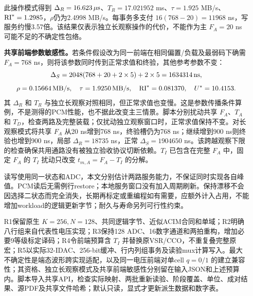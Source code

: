 此操作模式得到 $\Delta_R=16.623\,\mu\mathrm{s}$、$T_R=17.021952$ ms、$\tau=1.925$ MB/s、$\mathrm{RI}^*=1.2985$，$\rho$仍为2.4998 MB/s。每事务多支付 $16(768-20)=11968$ ns，写服务约慢3.57倍。该结果仅表示独立长观察操作的代价，不能作为主 $F_A=20$ ns 可能不足的不确定性包络。

\textbf{共享前端参数敏感性。}若条件假设改为同一前端在相同偏置/负载及最弱码下确需 $F_A=768$ ns，则将该参数同时传到正常求值和终验，其他参考参数不变：
\[
 \Delta_S=2048(768+20+2\times5)+2\times5=1634314\,\mathrm{ns},
\]
\[
 \rho=0.15664\,\mathrm{MB/s},\quad
 \tau=1.9250\,\mathrm{MB/s},\quad
 \mathrm{RI}^*=0.081370,\quad U^*=10.4153.
\]
其 $\Delta_R$ 和 $T_R$ 与独立长观察对照相同，但正常求值也变慢。这是参数传播条件算例，不是测得的PCM性能，也不据此改变主三情景。脚本分别扰动共享 $F_A$、$T_A$ 和 $T_D$，检查两路及完整装载；仅扰动独立观察窗口时，正常求值保持不变。对长观察模式将共享 $F_A$ 从20 ns增到768 ns，终验槽仍为768 ns；继续增到900 ns则终验也增到900 ns，局部 $\Delta_R=18735$ ns，正常 $\Delta_S=1904650$ ns。该跨越观察下限的检查确保共用通路没有被独立验收协议切断依赖。$T_I$ 已包含在完整 $F_A$ 中，固定 $F_A$ 的 $T_I$ 扰动只改变 $t_{m,A}=F_A-T_I$ 的分解。

读写使用同一状态和ADC，本文分别估计两路服务能力，不保证同时实现各自峰值。PCM读后无需例行restore；本地服务窗口没有加入周期刷新。保持漂移不会因选择二状态而完全消失，长期再标定或重编程如有需要，应额外计入占用，不能增加workload的逻辑更新字节；耐久与寿命另列可行性约束。

R1保留原生 $K=256,N=128$、共同逻辑字节、近似ACIM合同和单域；R2明确八行组来自代表性电压实现；R3保持128 ADC、16数字通道和两拍重构，增加必要9等级标定译码；R4令前端预算含 $T_I$ 并替换原VSR/CCO，不重复叠完整原宏；R5以实际32-IDAC、256-bit缓冲、行内列组事务及读验mux计算写入。最大不确定性是端态波形跨实现适配，以及同一电压前端对单cell $q=0/1$ 的建立兼容性；其资格、独立长观察模式及共享前端敏感性分别留在输入JSON和上述预算内。脚本导入共享API，检查实际映射、两批重新读验、阶段覆盖、单位、成对结果、源PDF及共享文件哈希；默认只读，显式才更新派生数据和数字表。
